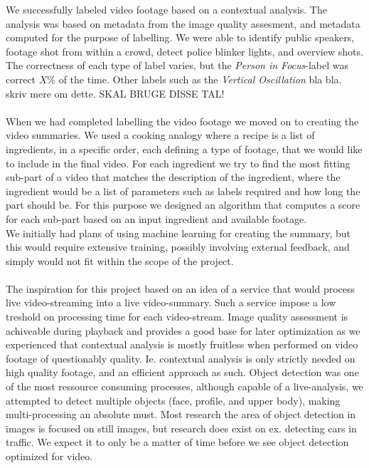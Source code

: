 We successfully labeled video footage based on a contextual analysis. The analysis was based on metadata from the image quality assesment, and metadata computed for the purpose of labelling. We were able to identify public speakers, footage shot from within a crowd, detect police blinker lights, and overview shots. 
\\
The correctness of each type of label varies, but the \emph{Person in Focus}-label was correct $X\%$ of the time. Other labels such as the \emph{Vertical Oscillation} bla bla. skriv mere om dette. SKAL BRUGE DISSE TAL!
\\\\
When we had completed labelling the video footage we moved on to creating the video summaries. We used a cooking analogy where a recipe is a list of ingredients, in a specific order, each defining a type of footage, that we would like to include in the final video. For each ingredient we try to find the most fitting sub-part of a video that matches the description of the ingredient, where the ingredient would be a list of parameters such as labels required and how long the part should be. For this purpose we designed an algorithm that computes a score for each sub-part based on an input ingredient and available footage.\\
We initially had plans of using machine learning for creating the summary, but this would require extensive training, possibly involving external feedback, and simply would not fit within the scope of the project.
\\\\
The inspiration for this project based on an idea of a service that would process live video-streaming into a live video-summary. Such a service impose a low treshold on processing time for each video-stream. Image quality assessment is achiveable during playback and provides a good base for later optimization as we experienced that contextual analysis is mostly fruitless when performed on video footage of questionably quality. Ie. contextual analysis is only strictly needed on high quality footage, and an efficient approach as such. Object detection was one of the most ressource consuming processes, although capable of a live-analysis, we attempted to detect multiple objects (face, profile, and upper body), making multi-processing an absolute must. Most research the area of object detection in images is focused on still images, but research does exist on ex. detecting cars in traffic. We expect it to only be a matter of time before we see object detection optimized for video.

